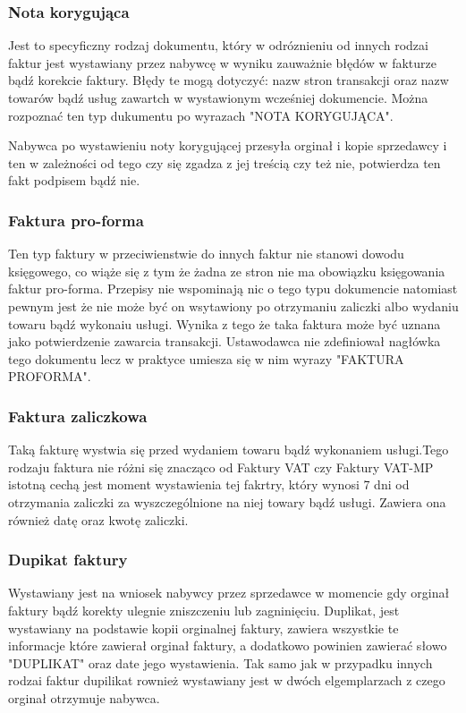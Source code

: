 \subsubsection{Nota korygująca}
Jest to specyficzny rodzaj dokumentu, który w odróznieniu od innych rodzai
faktur jest wystawiany przez nabywcę w wyniku zauważnie błędów w fakturze bądź
korekcie faktury. Błędy te mogą dotyczyć: nazw stron transakcji oraz nazw
towarów bądź usług zawartch w wystawionym wcześniej dokumencie. Można rozpoznać
ten typ dukumentu po wyrazach "NOTA KORYGUJĄCA".

Nabywca po wystawieniu noty korygującej przesyła orginał i kopie sprzedawcy i
ten w zależności od tego czy się zgadza z jej treścią czy też nie, potwierdza
ten fakt podpisem bądź nie.
\subsubsection{Faktura pro-forma}
Ten typ faktury w przeciwienstwie do innych faktur nie stanowi dowodu
księgowego, co wiąże się z tym że żadna ze stron nie ma obowiązku księgowania
faktur pro-forma. Przepisy nie wspominają nic o tego typu dokumencie natomiast
pewnym jest że nie może być on wsytawiony po otrzymaniu zaliczki albo wydaniu
towaru bądź wykonaiu usługi. Wynika z tego że taka faktura może być uznana jako
potwierdzenie zawarcia transakcji. Ustawodawca nie zdefiniował nagłówka tego
dokumentu lecz w praktyce umiesza się w nim wyrazy "FAKTURA PROFORMA".
\subsubsection{Faktura zaliczkowa}
Taką fakturę
wystwia się przed wydaniem towaru bądź wykonaniem usługi.Tego rodzaju faktura nie różni się znacząco od Faktury VAT czy Faktury VAT-MP
istotną cechą jest moment wystawienia tej fakrtry, który wynosi 7 dni od
otrzymania zaliczki za wyszczególnione na niej towary bądź usługi. Zawiera ona
również datę oraz kwotę zaliczki.
\subsubsection{Dupikat faktury}
Wystawiany jest na wniosek nabywcy przez sprzedawce w momencie gdy orginał
faktury bądź korekty ulegnie zniszczeniu lub zagninięciu. Duplikat, jest
wystawiany na podstawie kopii orginalnej faktury, zawiera wszystkie te
informacje które zawierał orginał faktury, a dodatkowo powinien zawierać słowo "DUPLIKAT" oraz date jego wystawienia. Tak samo jak w przypadku
innych rodzai faktur dupilikat rownież wystawiany jest w dwóch elgemplarzach z
czego orginał otrzymuje nabywca.
